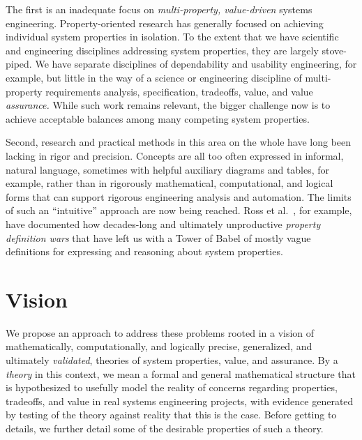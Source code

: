 \documentclass[conference]{IEEEtran}
\begin{document}
The first is an inadequate focus on {\em multi-property, value-driven} systems engineering. Property-oriented research has generally focused on achieving individual system properties in isolation. To the extent that we have scientific and engineering disciplines addressing system properties, they are largely stove-piped. We have separate disciplines of dependability and usability engineering, for example, but little in the way of a science or engineering discipline of multi-property requirements analysis, specification, tradeoffs, value, and value {\em assurance.} While such work remains relevant, the bigger challenge now is to achieve acceptable balances among many competing system properties. 

Second, research and practical methods in this area on the whole have long been lacking in rigor and precision. Concepts are all too often expressed in informal, natural language, sometimes with helpful auxiliary diagrams and tables, for example, rather than in rigorously mathematical, computational, and logical forms that can support rigorous engineering analysis and automation. The limits of such an ``intuitive'' approach are now being reached. Ross et al.~\cite{Ross:semantic}, for example, have documented how decades-long and ultimately unproductive {\em property definition wars} that have left us with a Tower of Babel of mostly vague definitions for expressing and reasoning about system properties.

\section{Vision}

We propose an approach to address these problems rooted in a vision of mathematically, computationally, and logically precise, generalized, and ultimately {\em validated}, theories of system properties, value, and assurance. By a {\em theory} in this context, we mean a formal and general mathematical structure that is hypothesized to usefully model the reality of concerns regarding properties, tradeoffs, and value in real systems engineering projects, with evidence generated by testing of the theory against reality that this is the case. Before getting to details, we further detail some of the desirable properties of such a theory.
\end{document}
